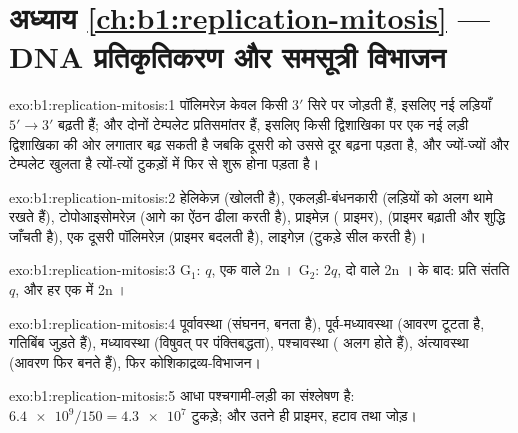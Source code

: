 \section*{अध्याय \ref{ch:b1:replication-mitosis} --- DNA प्रतिकृतिकरण और समसूत्री विभाजन}

\begin{solution}{exo:b1:replication-mitosis:1}
पॉलिमरेज़  केवल किसी $3'$ सिरे पर जोड़ती हैं, इसलिए नई
लड़ियाँ $5' \to 3'$ बढ़ती हैं; और दोनों टेम्पलेट प्रतिसमांतर हैं, इसलिए
किसी द्विशाखिका पर एक नई लड़ी द्विशाखिका की ओर लगातार बढ़ सकती है जबकि
दूसरी को उससे दूर बढ़ना पड़ता है, और ज्यों-ज्यों और टेम्पलेट खुलता है
त्यों-त्यों टुकड़ों में फिर से शुरू होना पड़ता है।
\end{solution}

\begin{solution}{exo:b1:replication-mitosis:2}
हेलिकेज़ (खोलती है), एकलड़ी-बंधनकारी  (लड़ियों को अलग थामे
रखते हैं), टोपोआइसोमरेज़ (आगे का ऐंठन ढीला करती है), प्राइमेज़ ( प्राइमर),
 (प्राइमर बढ़ाती और शुद्धि जाँचती है), एक दूसरी पॉलिमरेज़
(प्राइमर बदलती है), लाइगेज़ (टुकड़े सील करती है)।
\end{solution}

\begin{solution}{exo:b1:replication-mitosis:3}
G$_1$: $q$, एक  वाले 2n । G$_2$: $2q$, दो
 वाले 2n ।  के बाद: प्रति संतति $q$,
और हर एक में 2n ।
\end{solution}

\begin{solution}{exo:b1:replication-mitosis:4}
पूर्वावस्था (संघनन,  बनता है), पूर्व-मध्यावस्था (आवरण टूटता है,
गतिबिंब जुड़ते हैं), मध्यावस्था (विषुवत् पर पंक्तिबद्धता), पश्चावस्था
( अलग होते हैं), अंत्यावस्था (आवरण फिर बनते हैं), फिर
कोशिकाद्रव्य-विभाजन।
\end{solution}

\begin{solution}{exo:b1:replication-mitosis:5}
आधा  पश्चगामी-लड़ी का संश्लेषण है: $\num{6.4e9}/150 =
\num{4.3e7}$ टुकड़े; और उतने ही प्राइमर, हटाव तथा जोड़।
\end{solution}

